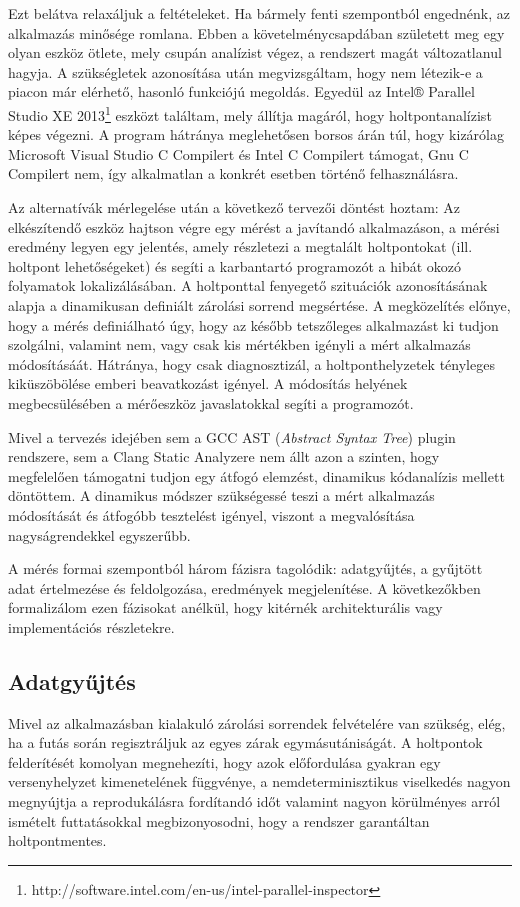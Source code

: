     Ezt belátva relaxáljuk a feltételeket. Ha bármely fenti szempontból engednénk, az alkalmazás minősége romlana. Ebben a követelménycsapdában született meg egy olyan eszköz ötlete, mely csupán analízist végez, a rendszert magát változatlanul hagyja. A szükségletek azonosítása után megvizsgáltam, hogy nem létezik-e a piacon már elérhető, hasonló funkciójú megoldás. Egyedül az Intel® Parallel Studio XE 2013\footnote{http://software.intel.com/en-us/intel-parallel-inspector} eszközt találtam, mely állítja magáról, hogy holtpontanalízist képes végezni. A program hátránya meglehetősen borsos árán túl, hogy kizárólag Microsoft Visual Studio C Compilert és Intel C Compilert támogat, Gnu C Compilert nem, így alkalmatlan a konkrét esetben történő felhasználásra.
    
    Az alternatívák mérlegelése után a következő tervezői döntést hoztam: Az elkészítendő eszköz hajtson végre egy mérést a javítandó alkalmazáson, a mérési eredmény legyen egy jelentés, amely részletezi a megtalált holtpontokat (ill. holtpont lehetőségeket) és segíti a karbantartó programozót a hibát okozó folyamatok lokalizálásában. A holtponttal fenyegető szituációk azonosításának alapja a dinamikusan definiált zárolási sorrend megsértése. A megközelítés előnye, hogy a mérés definiálható úgy, hogy az később tetszőleges alkalmazást ki tudjon szolgálni, valamint nem, vagy csak kis mértékben igényli a mért alkalmazás módosításáát. Hátránya, hogy csak diagnosztizál, a holtponthelyzetek tényleges kiküszöbölése emberi beavatkozást igényel. A módosítás helyének megbecsülésében a mérőeszköz javaslatokkal segíti a programozót.
    
    Mivel a tervezés idejében sem a GCC AST (\emph{Abstract Syntax Tree}) plugin rendszere, sem a Clang Static Analyzere nem állt azon a szinten, hogy megfelelően támogatni tudjon egy átfogó elemzést, dinamikus kódanalízis mellett döntöttem. A dinamikus módszer szükségessé teszi a mért alkalmazás módosítását és átfogóbb tesztelést igényel, viszont a megvalósítása nagyságrendekkel egyszerűbb.
    
    A mérés formai szempontból három fázisra tagolódik: adatgyűjtés, a gyűjtött adat értelmezése és feldolgozása, eredmények megjelenítése. A következőkben formalizálom ezen fázisokat anélkül, hogy kitérnék architekturális vagy implementációs részletekre.
    
    \subsection{Adatgyűjtés}
    Mivel az alkalmazásban kialakuló zárolási sorrendek felvételére van szükség, elég, ha a futás során regisztráljuk az egyes zárak egymásutániságát. A holtpontok felderítését komolyan megnehezíti, hogy azok előfordulása gyakran egy versenyhelyzet kimenetelének függvénye, a nemdeterminisztikus viselkedés nagyon megnyújtja a reprodukálásra fordítandó időt valamint nagyon körülményes arról ismételt futtatásokkal megbizonyosodni, hogy a rendszer garantáltan holtpontmentes.
    
